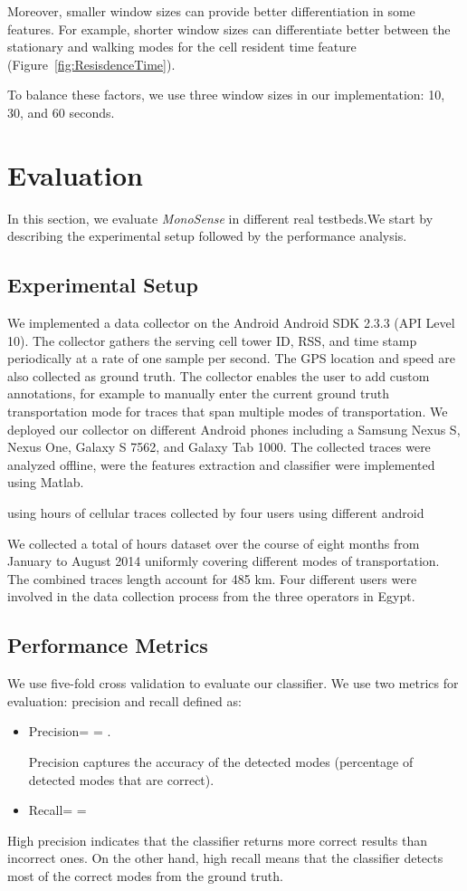 \documentclass[conference]{IEEEtran}
\def \sys {\textit{MonoSense}}
\begin{document}
Moreover, smaller window sizes can provide better differentiation in some features. For example, shorter window sizes can differentiate better between the stationary and walking modes for the cell resident time feature (Figure~\ref{fig:ResisdenceTime}).

To balance these factors, we use three window sizes in our implementation: 10, 30, and 60 seconds.

	
\section{Evaluation}\label{sec:evaluation}
In this section, we evaluate \sys{} in different real testbeds.We start by describing the experimental setup followed by the performance analysis.
\subsection{Experimental Setup}
We implemented a data collector on the Android Android SDK 2.3.3 (API Level 10). The collector gathers the serving cell tower ID, RSS, and time stamp periodically at a rate of one sample per second. The GPS location and speed are also collected as ground truth. The collector enables the user to add custom annotations, for example to manually enter the current ground truth transportation mode for traces that span multiple modes of transportation. We deployed our collector on different Android phones including a Samsung Nexus S, Nexus One, Galaxy S 7562, and  Galaxy Tab 1000. The collected traces were analyzed offline, were the features extraction and classifier were implemented using Matlab.

 using  hours of cellular traces  collected by four users using different android

We collected a total of  hours dataset over the course of eight months from January to August 2014 uniformly covering different modes of transportation. The combined traces length account for 485 km. Four different users were involved in the data collection process from the three operators in Egypt. 
\subsection{Performance Metrics}
We use five-fold cross validation to evaluate our classifier. We use two metrics for evaluation: precision and recall defined as:
\begin{itemize}
\item Precision= = .

    Precision captures the accuracy of the detected modes (percentage of detected modes that are correct).
\item Recall= = 

\end{itemize}
High precision indicates that the classifier returns more correct results than incorrect ones. On the other hand, high recall means that the classifier detects most of the correct modes from the ground truth.
\end{document}
